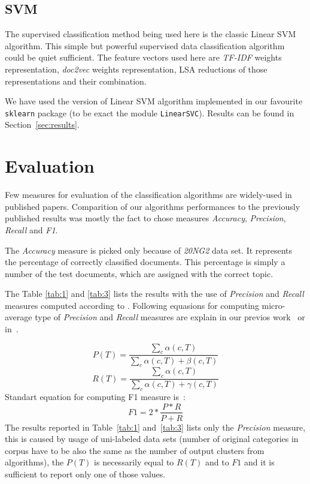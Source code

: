 \documentclass[runningheads,a4paper]{llncs}
\begin{document}
\subsection{SVM}
\label{subsec:svm}
The supervised classification method being used here is the classic Linear SVM algorithm. This simple but powerful supervised data classification algorithm could be quiet sufficient. The feature vectors used here are \emph{TF-IDF} weights representation, \emph{doc2vec} weights representation, LSA reductions of those representations and their combination. 

We have used the version of Linear SVM algorithm implemented in our favourite \texttt{sklearn} package (to be exact the module \texttt{LinearSVC}). Results can be found in Section~\ref{sec:results}. 

\section{Evaluation}
\label{sec:eval}
Few measures for evaluation of the classification algorithms are widely-used in published papers. Comparition of our algorithms performances to the previously published results was mostly the fact  to chose measures \emph{Accuracy}, \emph{Precision}, \emph{Recall} and \emph{F1}.

The \emph{Accuracy} measure is picked only because of \emph{20NG2} data set. It represents the percentage of correctly classified documents. This percentage is simply a number of the test documents, which are assigned with the correct topic. 

The Table \ref{tab:1} and \ref{tab:3} lists the results with the use of \emph{Precision} and \emph{Recall} measures computed according to \cite{refVysEval}. Following equasions for computing micro-average type of \emph{Precision} and \emph{Recall} measures are explain in our previos work~\cite{novotny2017unsupervised} or in~\cite{refVysEval}.

\begin{equation}
P(T) = \frac{\sum_c \alpha (c,T)}{\sum_c \alpha (c,T)+\beta (c,T)}
\label{pr}
\end{equation}
\begin{equation}
R(T) =  \frac{\sum_c \alpha (c,T)}{\sum_c \alpha (c,T)+\gamma (c,T)}
\label{re}
\end{equation}
Standart equation for computing F1 measure is~\cite{chinniyan2017semantic}: 
\begin{equation}
F1 = 2* \frac{P*R}{P+R}
\label{e:f1}
\end{equation}
The results reported in Table~\ref{tab:1} and~\ref{tab:3} lists only the \emph{Precision} measure, this is caused by usage of uni-labeled data sets (number of original categories in corpus have to be also the same as the number of output clusters from algorithms), the $P(T)$ is necessarily equal to $R(T)$ and to $F1$ and it is sufficient to report only one of those values.
\end{document}
